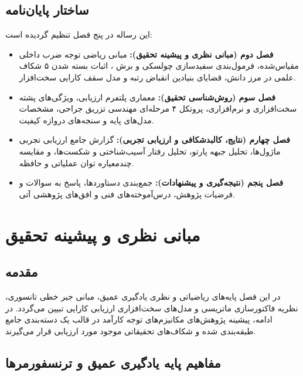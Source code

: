 \documentclass[12pt,a4paper]{report}
\theoremstyle{definition}
\begin{document}
\section{ساختار پایان‌نامه}
این رساله در پنج فصل تنظیم گردیده است:
\begin{itemize}
    \item \textbf{فصل دوم (مبانی نظری و پیشینه تحقیق):} مبانی ریاضی توجه ضرب داخلی مقیاس‌شده، فرمول‌بندی سفیدسازی چولسکی و برش ، اثبات بسته شدن ۵ شکاف علمی در مرز دانش، قضایای بنیادین انقباض رتبه و مدل سقف کارایی سخت‌افزار.
    \item \textbf{فصل سوم (روش‌شناسی تحقیق):} معماری پلتفرم ارزیابی، ویژگی‌های پشته سخت‌افزاری و نرم‌افزاری، پروتکل ۴ مرحله‌ای مهندسی تزریق جراحی، مشخصات مدل‌های پایه و سنجه‌های دروازه کیفیت.
    \item \textbf{فصل چهارم (نتایج، کالبدشکافی و ارزیابی تجربی):} گزارش جامع ارزیابی تجربی ماژول‌ها، تحلیل جبهه پارتو، تحلیل رفتار آسیب‌شناختی و شکست‌ها، و مقایسه چندمعیاره توان عملیاتی و حافظه.
    \item \textbf{فصل پنجم (نتیجه‌گیری و پیشنهادات):} جمع‌بندی دستاوردها، پاسخ به سوالات و فرضیات پژوهش، درس‌آموخته‌های فنی و افق‌های پژوهشی آتی.
\end{itemize}

\chapter{مبانی نظری و پیشینه تحقیق}
\label{chap:theory}

\section{مقدمه}
در این فصل پایه‌های ریاضیاتی و نظری یادگیری عمیق، مبانی جبر خطی تانسوری، نظریه فاکتورسازی ماتریسی و مدل‌های سخت‌افزاری ارزیابی کارایی تبیین می‌گردد. در ادامه، پیشینه پژوهش‌های مکانیزم‌های توجه کارآمد در قالب یک دسته‌بندی جامع طبقه‌بندی شده و شکاف‌های تحقیقاتی موجود مورد ارزیابی قرار می‌گیرند.

\section{مفاهیم پایه یادگیری عمیق و ترنسفورمرها}
\end{document}
